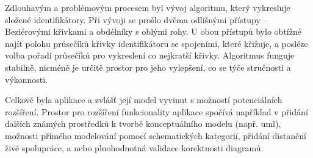 Zdlouhavým a problémovým procesem byl vývoj algoritmu, který vykresluje složené identifikátory.
Při vývoji se prošlo dvěma odlišnými přístupy -- Beziérovými křivkami a obdélníky s oblými rohy.
U obou přístupů bylo obtížné najít polohu průsečíků křivky identifikátoru se spojeními, které křižuje, a posléze volba pořadí průsečíků pro vykreslení co nejkratší křivky.
Algoritmus funguje stabilně, nicméně je určitě prostor pro jeho vylepšení, co se týče stručnosti a výkonnosti.

Celkově byla aplikace a zvlášť její model vyvinut s možností potenciálních rozšíření.
Prostor pro rozšíření funkcionality aplikace spočívá například v přidání dalších známých prostředků k tvorbě konceptuálního modelu (např. \acrshort{uml}), možnosti přímého modelování pomocí schematických kategorií, přidání distanční živé spolupráce, a nebo plnohodnotná validace korektnosti diagramů.
